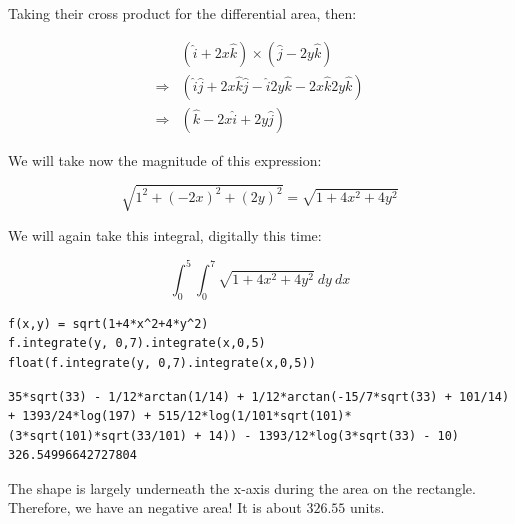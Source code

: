 \documentclass[letterpaper]{article}
\begin{document}
Taking their cross product for the differential area, then:

\begin{align}
& (\hat{i} + 2x \hat{k}) \times (\hat{j} - 2y \hat{k})\\
\Rightarrow & (\hat{i}\hat{j} + 2x \hat{k}\hat{j} - \hat{i}2y \hat{k} -2x \hat{k}2y \hat{k})\\
\Rightarrow & (\hat{k} - 2x \hat{i} + 2y \hat{j})
\end{align}

We will take now the magnitude of this expression:

\begin{equation}
   \sqrt{1^2 + (-2x)^2 + (2y) ^2 } = \sqrt{1 + 4x^2 + 4y^2}
\end{equation}

We will again take this integral, digitally this time:

\begin{equation}
  \int_0^5 \int_0^7 \sqrt{1+4x^2+4y^2} \ dy\ dx
\end{equation}

\begin{verbatim}
f(x,y) = sqrt(1+4*x^2+4*y^2)
f.integrate(y, 0,7).integrate(x,0,5)
float(f.integrate(y, 0,7).integrate(x,0,5))
\end{verbatim}

\begin{verbatim}
35*sqrt(33) - 1/12*arctan(1/14) + 1/12*arctan(-15/7*sqrt(33) + 101/14) + 1393/24*log(197) + 515/12*log(1/101*sqrt(101)*(3*sqrt(101)*sqrt(33/101) + 14)) - 1393/12*log(3*sqrt(33) - 10)
326.54996642727804
\end{verbatim}


The shape is largely underneath the x-axis during the area on the rectangle. Therefore, we have an negative area! It is about \(326.55\) units.
\end{document}
